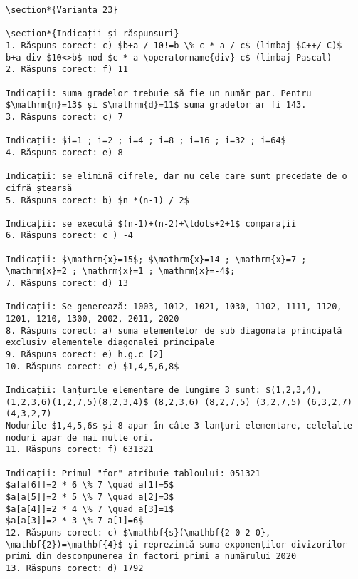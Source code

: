 \begin{verbatim}
\section*{Varianta 23}

\section*{Indicații și răspunsuri}
1. Răspuns corect: c) $b+a / 10!=b \% c * a / c$ (limbaj $C++/ C)$
b+a div $10<>b$ mod $c * a \operatorname{div} c$ (limbaj Pascal)
2. Răspuns corect: f) 11

Indicații: suma gradelor trebuie să fie un număr par. Pentru $\mathrm{n}=13$ și $\mathrm{d}=11$ suma gradelor ar fi 143.
3. Răspuns corect: c) 7

Indicații: $i=1 ; i=2 ; i=4 ; i=8 ; i=16 ; i=32 ; i=64$
4. Răspuns corect: e) 8

Indicații: se elimină cifrele, dar nu cele care sunt precedate de o cifră ștearsă
5. Răspuns corect: b) $n *(n-1) / 2$

Indicații: se execută $(n-1)+(n-2)+\ldots+2+1$ comparații
6. Răspuns corect: c ) -4

Indicații: $\mathrm{x}=15$; $\mathrm{x}=14 ; \mathrm{x}=7 ; \mathrm{x}=2 ; \mathrm{x}=1 ; \mathrm{x}=-4$;
7. Răspuns corect: d) 13

Indicații: Se generează: 1003, 1012, 1021, 1030, 1102, 1111, 1120, 1201, 1210, 1300, 2002, 2011, 2020
8. Răspuns corect: a) suma elementelor de sub diagonala principală exclusiv elementele diagonalei principale
9. Răspuns corect: e) h.g.c [2]
10. Răspuns corect: e) $1,4,5,6,8$

Indicații: lanțurile elementare de lungime 3 sunt: $(1,2,3,4),(1,2,3,6)(1,2,7,5)(8,2,3,4)$ (8,2,3,6) (8,2,7,5) (3,2,7,5) (6,3,2,7) (4,3,2,7)
Nodurile $1,4,5,6$ și 8 apar în câte 3 lanțuri elementare, celelalte noduri apar de mai multe ori.
11. Răspuns corect: f) 631321

Indicații: Primul "for" atribuie tabloului: 051321
$a[a[6]]=2 * 6 \% 7 \quad a[1]=5$
$a[a[5]]=2 * 5 \% 7 \quad a[2]=3$
$a[a[4]]=2 * 4 \% 7 \quad a[3]=1$
$a[a[3]]=2 * 3 \% 7 a[1]=6$
12. Răspuns corect: c) $\mathbf{s}(\mathbf{2 0 2 0}, \mathbf{2})=\mathbf{4}$ și reprezintă suma exponenților divizorilor primi din descompunerea în factori primi a numărului 2020
13. Răspuns corect: d) 1792


\end{verbatim}
